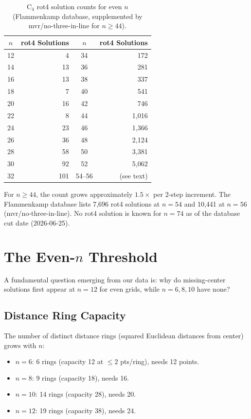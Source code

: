 \documentclass[11pt,a4paper]{article}
\theoremstyle{plain}
\theoremstyle{definition}
\begin{document}
\begin{table}[H]
\centering
\caption{C$_4$ rot4 solution counts for even $n$ (Flammenkamp database, supplemented by mvr/no-three-in-line for $n\ge44$).}
\label{tab:c4counts}
\footnotesize
\begin{tabular}{crcr}
\toprule
$n$ & rot4 Solutions & $n$ & rot4 Solutions \\
\midrule
12 & 4 & 34 & 172\\
14 & 13 & 36 & 281\\
16 & 13 & 38 & 337\\
18 & 7 & 40 & 541\\
20 & 16 & 42 & 746\\
22 & 8 & 44 & 1,016\\
24 & 23 & 46 & 1,366\\
26 & 36 & 48 & 2,124\\
28 & 58 & 50 & 3,381\\
30 & 92 & 52 & 5,062\\
32 & 101 & 54--56 & (see text)\\
\bottomrule
\end{tabular}
\end{table}

For $n\ge44$, the count grows approximately $1.5\times$ per 2-step increment. The Flammenkamp database lists 7,696 rot4 solutions at $n=54$ and 10,441 at $n=56$ (mvr/no-three-in-line). No rot4 solution is known for $n=74$ as of the database cut date (2026-06-25).

\section{The Even-$n$ Threshold}
\label{sec:even}

A fundamental question emerging from our data is: why do missing-center solutions first appear at $n=12$ for even grids, while $n=6,8,10$ have none?

\subsection{Distance Ring Capacity}

The number of distinct distance rings (squared Euclidean distances from center) grows with $n$:
\begin{itemize}
\item $n=6$: 6 rings (capacity 12 at $\le2$ pts/ring), needs 12 points.
\item $n=8$: 9 rings (capacity 18), needs 16.
\item $n=10$: 14 rings (capacity 28), needs 20.
\item $n=12$: 19 rings (capacity 38), needs 24.
\end{itemize}
\end{document}
